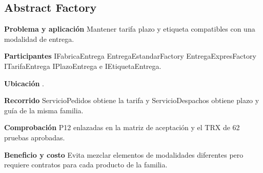 \noindent\begin{minipage}{\linewidth}
\subsection{Abstract Factory}
\textbf{Problema y aplicación} Mantener tarifa plazo y etiqueta compatibles con una modalidad de entrega.

\textbf{Participantes} IFabricaEntrega EntregaEstandarFactory EntregaExpresFactory ITarifaEntrega IPlazoEntrega e IEtiquetaEntrega.

\textbf{Ubicación} \href{https://github.com/Alan77-bot/LogiMarket360Alan/blob/68bda51063441415524ede51bdf61649ee9b4973/LogiMarket.Domain/Entregas/IFabricaEntrega.cs#L6}{}.

\textbf{Recorrido} ServicioPedidos obtiene la tarifa y ServicioDespachos obtiene plazo y guía de la misma familia.


\textbf{Comprobación} P12 enlazadas en la matriz de aceptación y el TRX de 62 pruebas aprobadas.

\textbf{Beneficio y costo} Evita mezclar elementos de modalidades diferentes pero requiere contratos para cada producto de la familia.

\end{minipage}\par\smallskip
